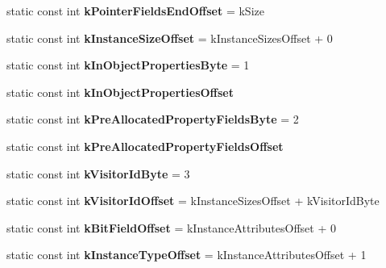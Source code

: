 \begin{DoxyCompactItemize}
\item 
\hypertarget{classv8_1_1internal_1_1_map_a03f76d6b32e01a0217d97d7a17d29781}{}static const int {\bfseries k\+Pointer\+Fields\+End\+Offset} = k\+Size\label{classv8_1_1internal_1_1_map_a03f76d6b32e01a0217d97d7a17d29781}

\item 
\hypertarget{classv8_1_1internal_1_1_map_a90565a6d11c9416b1768a6e51849614e}{}static const int {\bfseries k\+Instance\+Size\+Offset} = k\+Instance\+Sizes\+Offset + 0\label{classv8_1_1internal_1_1_map_a90565a6d11c9416b1768a6e51849614e}

\item 
\hypertarget{classv8_1_1internal_1_1_map_a31715dacc7cd036e31b19628d5442bf6}{}static const int {\bfseries k\+In\+Object\+Properties\+Byte} = 1\label{classv8_1_1internal_1_1_map_a31715dacc7cd036e31b19628d5442bf6}

\item 
static const int {\bfseries k\+In\+Object\+Properties\+Offset}
\item 
\hypertarget{classv8_1_1internal_1_1_map_a7c17ed784f7048eea5a540a3ab3e795c}{}static const int {\bfseries k\+Pre\+Allocated\+Property\+Fields\+Byte} = 2\label{classv8_1_1internal_1_1_map_a7c17ed784f7048eea5a540a3ab3e795c}

\item 
static const int {\bfseries k\+Pre\+Allocated\+Property\+Fields\+Offset}
\item 
\hypertarget{classv8_1_1internal_1_1_map_a6dc85d25a73a94ab6660530695bac8ae}{}static const int {\bfseries k\+Visitor\+Id\+Byte} = 3\label{classv8_1_1internal_1_1_map_a6dc85d25a73a94ab6660530695bac8ae}

\item 
\hypertarget{classv8_1_1internal_1_1_map_a75fed4ddabed6fed23748405c5de491a}{}static const int {\bfseries k\+Visitor\+Id\+Offset} = k\+Instance\+Sizes\+Offset + k\+Visitor\+Id\+Byte\label{classv8_1_1internal_1_1_map_a75fed4ddabed6fed23748405c5de491a}

\item 
\hypertarget{classv8_1_1internal_1_1_map_a346c93635c7bba2c256e1703121e9ea8}{}static const int {\bfseries k\+Bit\+Field\+Offset} = k\+Instance\+Attributes\+Offset + 0\label{classv8_1_1internal_1_1_map_a346c93635c7bba2c256e1703121e9ea8}

\item 
\hypertarget{classv8_1_1internal_1_1_map_a6a9a39baa24992d237b42edcf634db9d}{}static const int {\bfseries k\+Instance\+Type\+Offset} = k\+Instance\+Attributes\+Offset + 1\label{classv8_1_1internal_1_1_map_a6a9a39baa24992d237b42edcf634db9d}


\end{DoxyCompactItemize}
